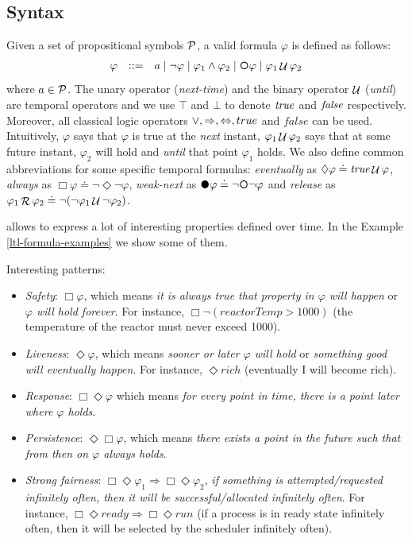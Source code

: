 \subsection{Syntax}\label{ltl-syntax}
Given a set of propositional symbols $\P$, a valid \LTL formula $\varphi$ is defined as follows:
\[\begin{array}{rcl}
\varphi &::=& a \mid \lnot \varphi \mid \varphi_1\land \varphi_2 \mid \Next\varphi \mid \varphi_1 \lUntil \varphi_2
\end{array}
\]
where $a\in \P$. The unary operator \Next  (\emph{next-time}) and the binary operator $\lUntil$  (\emph{until}) are temporal operators and we use $\top$ and $\bot$ to denote $\true$ and $\false$ respectively. Moreover, all classical logic operators $\lOR, \Rightarrow, \Leftrightarrow, true$ and $false$ can be used. 
Intuitively, \Next $\varphi$ says that $\varphi$ is true at the \textit{next} instant, $\varphi_1 \lUntil \varphi_2$ says that at some future instant, $\varphi_2$ will hold and \textit{until} that point $\varphi_1$ holds. We also define common abbreviations for some specific temporal formulas: \emph{eventually} as $\Diamond \varphi \doteq \true \lUntil \varphi$, \emph{always} as $\Box \varphi \doteq \lnot \Diamond \lnot \varphi$, \emph{weak-next} as $\Wnext \varphi \doteq \lnot \Next \lnot \varphi$ and \emph{release} as $\varphi_1 \Release \varphi_2 \doteq \lnot (\lnot \varphi_1 \lUntil \lnot \varphi_2)$. 

\LTL allows to express a lot of interesting properties defined over time. In the Example \ref{ltl-formula-examples} we show some of them.
\begin{example}\label{ltl-formula-examples}
Interesting \LTL patterns:
\begin{itemize}
	\item \emph{Safety}: $\Box \varphi$, which means \emph{it is always true that property in $\varphi$ will happen} or \emph{$\varphi$ will hold forever}. For instance, $\Box \lnot (reactorTemp > 1000)$ (the temperature of the reactor must never exceed 1000).
	\item \emph{Liveness}: $\Diamond \varphi$, which means \emph{sooner or later $\varphi$ will hold} or \emph{something good will eventually happen}. For instance, $\Diamond rich$ (eventually I will become rich).
	\item \emph{Response}: $\Box \Diamond \varphi$ which means \emph{for every point in time, there is a point later where $\varphi$ holds}.
	\item \emph{Persistence}: $\Diamond \Box \varphi$, which means \emph{there exists a point in the future such that from then on $\varphi$ always holds}.
	\item \emph{Strong fairness}: $\Box \Diamond \varphi_1 \Rightarrow \Box \Diamond \varphi_2$, \emph{if something is attempted/requested infinitely often, then it will be successful/allocated infinitely often}. For instance, $\Box \Diamond ready \Rightarrow \Box \Diamond run$ (if a process is in ready state infinitely often, then it will be selected by the scheduler infinitely often).
\end{itemize}
\end{example}

